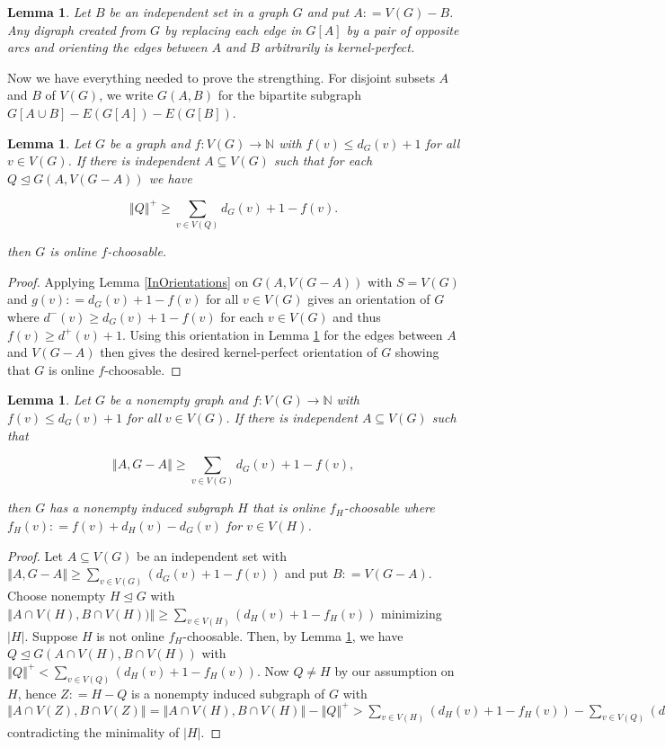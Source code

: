 \documentclass[12pt]{article}
\theoremstyle{plain}
\newtheorem{lem}[thm]{Lemma}
\theoremstyle{definition}
\theoremstyle{remark}
\newcommand{\IN}{\mathbb{N}}
\newcommand{\card}[1]{\left|#1\right|}
\newcommand{\size}[1]{\left\Vert#1\right\Vert}
\newcommand{\func}[3]{#1\colon #2 \rightarrow #3}
\newcommand{\parens}[1]{\left( #1 \right)}
\newcommand{\DefinedAs}{\mathrel{\mathop:}=}
\begin{document}
\begin{lem}\label{KernelPerfect}
Let $B$ be an independent set in a graph $G$ and put $A \DefinedAs V(G) - B$.  Any digraph created from $G$ by replacing each edge in $G[A]$ by a pair of opposite arcs and orienting the edges between $A$ and $B$ arbitrarily is kernel-perfect.
\end{lem}

Now we have everything needed to prove the strengthing.  For disjoint subsets $A$ and $B$ of $V(G)$, we write $G(A, B)$ for the bipartite subgraph $G[A \cup B] - E(G[A]) - E(G[B])$.  

\begin{lem}\label{MicStrength}
Let $G$ be a graph and $\func{f}{V(G)}{\IN}$ with $f(v) \leq d_G(v) + 1$ for all $v \in V(G)$.  If there is independent $A \subseteq V(G)$ such that for each $Q \unlhd G(A, V(G-A))$ we have

\[\size{Q}^+ \geq  \sum_{v \in V(Q)} d_G(v) + 1 - f(v).\]

\noindent then $G$ is online $f$-choosable.
\end{lem}
\begin{proof}
Applying Lemma \ref{InOrientations} on $G(A, V(G-A))$ with $S = V(G)$ and $g(v) \DefinedAs d_G(v) + 1 - f(v)$ for all $v \in V(G)$ gives an orientation of $G$ where $d^-(v) \geq d_G(v) + 1 - f(v)$ for each $v \in V(G)$ and thus $f(v) \geq d^+(v) + 1$.  Using this orientation in Lemma \ref{KernelPerfect} for the edges between $A$ and $V(G-A)$ then gives the desired kernel-perfect orientation of $G$ showing that $G$ is online $f$-choosable.
\end{proof}

\begin{lem}\label{SecondStrengtheningMic}
Let $G$ be a nonempty graph and $\func{f}{V(G)}{\IN}$ with $f(v) \leq d_G(v) + 1$ for all $v \in V(G)$. If there is independent $A \subseteq V(G)$ such that

\[\size{A, G-A} \geq  \sum_{v \in V(G)} d_G(v) + 1 - f(v),\]

\noindent then $G$ has a nonempty induced subgraph $H$ that is online $f_H$-choosable where $f_H(v) \DefinedAs f(v) + d_H(v) - d_G(v)$ for $v \in V(H)$.
\end{lem}
\begin{proof}
Let $A \subseteq V(G)$ be an independent set with $\size{A, G-A} \geq \sum_{v \in V(G)} \parens{d_G(v) + 1 - f(v)}$ and put $B \DefinedAs V(G-A)$. Choose nonempty $H \unlhd G$ with $\size{A \cap V(H), B \cap V(H))} \geq  \sum_{v \in V(H)} \parens{d_H(v) + 1 - f_H(v)}$ minimizing $\card{H}$. Suppose $H$ is not online $f_H$-choosable. Then, by Lemma \ref{MicStrength}, we have $Q \unlhd G(A \cap V(H), B \cap V(H))$ with $\size{Q}^+ < \sum_{v \in V(Q)} \parens{d_H(v) + 1 - f_H(v)}$.  Now $Q \neq H$ by our assumption on $H$, hence $Z \DefinedAs H-Q$ is a nonempty induced subgraph of $G$ with $\size{A \cap V(Z), B \cap V(Z)} = \size{A \cap V(H), B \cap V(H)} - \size{Q}^+ > \sum_{v \in V(H)} \parens{d_H(v) + 1 - f_H(v)} - \sum_{v \in V(Q)} \parens{d_H(v) + 1 - f_H(v)} = \sum_{v \in V(Z)} \parens{d_Z(v) + 1 - f_Z(v)}$ contradicting the minimality of $\card{H}$.
\end{proof}
\end{document}
